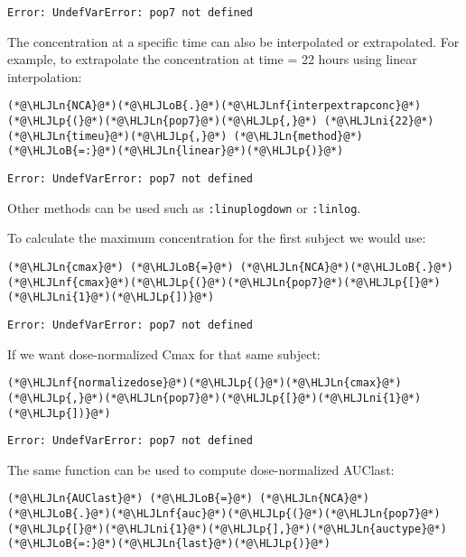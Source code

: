 \documentclass[12pt,a4paper]{article}
\newcommand{\HLJLn}[1]{#1}
\newcommand{\HLJLnf}[1]{\textcolor[RGB]{66,102,213}{#1}}
\newcommand{\HLJLni}[1]{\textcolor[RGB]{59,151,46}{#1}}
\newcommand{\HLJLoB}[1]{\textcolor[RGB]{102,102,102}{\textbf{#1}}}
\newcommand{\HLJLp}[1]{#1}
\begin{document}
\begin{lstlisting}
Error: UndefVarError: pop7 not defined
\end{lstlisting}


The concentration at a specific time can also be interpolated or extrapolated. For example, to extrapolate the concentration at time = 22 hours using linear interpolation:


\begin{lstlisting}
(*@\HLJLn{NCA}@*)(*@\HLJLoB{.}@*)(*@\HLJLnf{interpextrapconc}@*)(*@\HLJLp{(}@*)(*@\HLJLn{pop7}@*)(*@\HLJLp{,}@*) (*@\HLJLni{22}@*)(*@\HLJLn{timeu}@*)(*@\HLJLp{,}@*) (*@\HLJLn{method}@*)(*@\HLJLoB{=:}@*)(*@\HLJLn{linear}@*)(*@\HLJLp{)}@*)
\end{lstlisting}

\begin{lstlisting}
Error: UndefVarError: pop7 not defined
\end{lstlisting}


Other methods can be used such as \texttt{:linuplogdown} or \texttt{:linlog}.

To calculate the maximum concentration for the first subject we would use:


\begin{lstlisting}
(*@\HLJLn{cmax}@*) (*@\HLJLoB{=}@*) (*@\HLJLn{NCA}@*)(*@\HLJLoB{.}@*)(*@\HLJLnf{cmax}@*)(*@\HLJLp{(}@*)(*@\HLJLn{pop7}@*)(*@\HLJLp{[}@*)(*@\HLJLni{1}@*)(*@\HLJLp{])}@*)
\end{lstlisting}

\begin{lstlisting}
Error: UndefVarError: pop7 not defined
\end{lstlisting}


If we want dose-normalized Cmax for that same subject:


\begin{lstlisting}
(*@\HLJLnf{normalizedose}@*)(*@\HLJLp{(}@*)(*@\HLJLn{cmax}@*)(*@\HLJLp{,}@*)(*@\HLJLn{pop7}@*)(*@\HLJLp{[}@*)(*@\HLJLni{1}@*)(*@\HLJLp{])}@*)
\end{lstlisting}

\begin{lstlisting}
Error: UndefVarError: pop7 not defined
\end{lstlisting}


The same function can be used to compute dose-normalized AUClast:


\begin{lstlisting}
(*@\HLJLn{AUClast}@*) (*@\HLJLoB{=}@*) (*@\HLJLn{NCA}@*)(*@\HLJLoB{.}@*)(*@\HLJLnf{auc}@*)(*@\HLJLp{(}@*)(*@\HLJLn{pop7}@*)(*@\HLJLp{[}@*)(*@\HLJLni{1}@*)(*@\HLJLp{],}@*)(*@\HLJLn{auctype}@*)(*@\HLJLoB{=:}@*)(*@\HLJLn{last}@*)(*@\HLJLp{)}@*)
\end{lstlisting}
\end{document}
